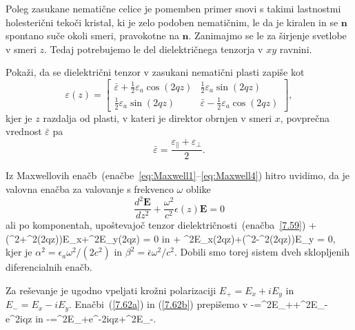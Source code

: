 Poleg zasukane nematične celice je pomemben primer
snovi s takimi lastnostmi holesterični tekoči kristal, ki je zelo
podoben nematičnim, le da je kiralen in se $\mathbf{n}$ spontano suče okoli
smeri, pravokotne na $\mathbf{n}$.
Zanimajmo se le za širjenje svetlobe v smeri $z$. 
Tedaj potrebujemo le del dielektričnega
tenzorja v $xy$ ravnini. 

\begin{definition}
Pokaži, da se dielektrični tenzor v zasukani nematični plasti zapiše kot
\begin{equation}
\varepsilon (z)=\left[\begin{array}{cc}
\bar{\varepsilon}+\frac{1}{2}\varepsilon_{a}\cos(2qz) & \frac{1}{2}\varepsilon_{a}\sin(2qz)\\
\frac{1}{2}\varepsilon_{a}\sin(2qz) & \bar{\varepsilon}-\frac{1}{2}\varepsilon_{a}\cos(2qz)
\end{array}\right],
\label{7.59}
\end{equation}
kjer  je $z$ razdalja od plasti, v kateri je direktor
obrnjen v smeri $x$, povprečna vrednost $\bar{\varepsilon}$ pa  
\begin{equation}
\bar{\varepsilon}=\frac{\varepsilon_{\parallel}+\varepsilon_{\perp}}{2}.
\label{7.60}
\end{equation}
\end{definition}

Iz Maxwellovih enačb~(enačbe~\ref{eq:Maxwell1}--\ref{eq:Maxwell4}) 
hitro uvidimo, da je valovna enačba
za valovanje s frekvenco $\omega$ oblike
\begin{equation}
\frac{d^{2}\mathbf{E}}{dz^{2}}+\frac{\omega^{2}}{c^{2}} \epsilon
(z)\mathbf{E}=0
\label{7.61}
\end{equation}
ali po komponentah, upoštevajoč tenzor dielektričnosti~(enačba~\ref{7.59})
\beq
{} + 
(\beta^{2}+\alpha^{2}\cos(2qz))E_{x}+\alpha^{2}E_{y}\sin(2qz) = 0
\label{7.62a}
\eeq
in 
\beq
{} +
\alpha^{2}E_{x}\sin(2qz)+(\beta^{2}-\alpha^{2}\cos(2qz))E_{y} = 0,
\label{7.62b}
\eeq
kjer je $\alpha^{2}=\epsilon_{a}\omega^{2}/(2c^{2})$ in 
$\beta^{2}=\bar{\epsilon}\omega^{2}/c^{2}$. Dobili smo torej sistem
dveh sklopljenih diferencialnih enačb. 

Za reševanje je ugodno vpeljati krožni polarizaciji 
$E_{+}=E_{x}+iE_{y}$ in $E_{-}=E_{x}-iE_{y}$.
Enačbi~(\ref{7.62a}) in (\ref{7.62b}) prepišemo v
\beq
-=\beta^{2}E_{+}+\alpha^{2}E_{-}e^{2iqz}
\label{lcm1}
\eeq
in 
\beq
-=\alpha^{2}E_{+}e^{-2iqz}+\beta^{2}E_{-}.
\label{lcm2}
\eeq

